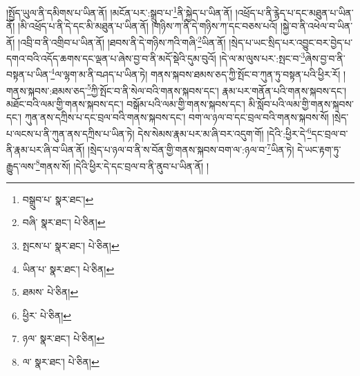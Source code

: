 །སྤྱོད་ཡུལ་ནི་དམིགས་པ་ཡིན་ནོ། །མངོན་པར་:སྒྲུབ་པ་\footnote{བསྒྲུབ་པ་  སྣར་ཐང་། }ནི་སྐྱེད་པ་ཡིན་ནོ། །འཕྲོད་པ་ནི་རྙེད་པ་དང་མཐུན་པ་ཡིན་ནོ། །མི་འཕྲོད་པ་ནི་དེ་དང་མི་མཐུན་པ་ཡིན་ནོ། །གཉིས་ཀ་ནི་དེ་གཉིས་ཀ་དང་བཅས་པའོ། །སྐྱེ་བ་ནི་འཕེལ་བ་ཡིན་ནོ། །འབྲི་བ་ནི་འགྲིབ་པ་ཡིན་ནོ། །ཐབས་ནི་དེ་གཉིས་ཀའི་གཞི་\footnote{བཞི་  སྣར་ཐང་།  པེ་ཅིན། }ཡིན་ནོ། །སྲེད་པ་ཡང་སྲིད་པར་འབྱུང་བར་བྱེད་པ་དགའ་བའི་འདོད་ཆགས་དང་ལྡན་པ་ཞེས་བྱ་བ་ནི་མདོ་སྡེའི་དུམ་བུའོ། །དེ་ལ་མ་ལུས་པར་:སྤང་བ་\footnote{སྤངས་པ་  སྣར་ཐང་།  པེ་ཅིན། }ཞེས་བྱ་བ་ནི་བསྟན་པ་ཡིན་\footnote{ཡིན་པ་  སྣར་ཐང་།  པེ་ཅིན། }ལ་ལྷག་མ་ནི་བཤད་པ་ཡིན་ཏེ། གནས་སྐབས་ཐམས་ཅད་ཀྱི་སྤོང་བ་ཀུན་ཏུ་བསྟན་པའི་ཕྱིར་རོ། །གནས་སྐབས་:ཐམས་ཅད་\footnote{ཐམས་  པེ་ཅིན། }ཀྱི་སྤོང་བ་ནི་སེལ་བའི་གནས་སྐབས་དང་། རྣམ་པར་གནོན་པའི་གནས་སྐབས་དང་། མཐོང་བའི་ལམ་གྱི་གནས་སྐབས་དང་། བསྒོམ་པའི་ལམ་གྱི་གནས་སྐབས་དང་། མི་སློབ་པའི་ལམ་གྱི་གནས་སྐབས་དང་། ཀུན་ནས་དཀྲིས་པ་དང་བྲལ་བའི་གནས་སྐབས་དང་། བག་ལ་ཉལ་བ་དང་བྲལ་བའི་གནས་སྐབས་སོ། །སྲེད་པ་ལངས་པ་ནི་ཀུན་ནས་དཀྲིས་པ་ཡིན་ཏེ། དེས་སེམས་རྣམ་པར་མ་ཞི་བར་འདུག་གོ། །དེའི་:ཕྱིར་དེ་\footnote{ཕྱིར་  པེ་ཅིན། }དང་བྲལ་བ་ནི་རྣམ་པར་ཞི་བ་ཡིན་ནོ། །སྲེད་པ་ཉལ་བ་ནི་ས་བོན་གྱི་གནས་སྐབས་བག་ལ་:ཉལ་བ་\footnote{ཉལ་  སྣར་ཐང་།  པེ་ཅིན། }ཡིན་ཏེ། དེ་ཡང་རྟག་ཏུ་རྒྱུད་ལས་\footnote{ལ་  སྣར་ཐང་།  པེ་ཅིན། }གནས་སོ། །དེའི་ཕྱིར་དེ་དང་བྲལ་བ་ནི་ནུབ་པ་ཡིན་ནོ། །
